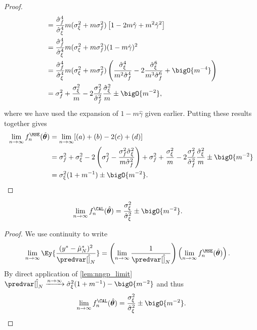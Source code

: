 \begin{proof}
\begin{align*}
        &= \frac{\hat{\sigma}_f^4}{\hat{\sigma}_\xi^4}m(\sigma_\xi^2+m\sigma_f^2)\left[1-2m\hat{\gamma}+m^2\hat{\gamma}^2\right] \\
        &= \frac{\hat{\sigma}_f^4}{\hat{\sigma}_\xi^4}m(\sigma_\xi^2+m\sigma_f^2)(1-m\hat{\gamma})^2 \\
        &= \frac{\hat{\sigma}_f^4}{\hat{\sigma}_\xi^4}m(\sigma_\xi^2+m\sigma_f^2)\left(\frac{\hat{\sigma}_\xi^4}{m^2\hat{\sigma}_f^4} - 2\frac{\hat{\sigma}_\xi^6}{m^3\hat{\sigma}_f^6} + \bigO{m^{-4}}\right) \\
        &= \sigma_f^2 + \frac{\sigma_\xi^2}{m} - 2\frac{\sigma_f^2}{\hat{\sigma}_f^2}\frac{\hat{\sigma}_\xi^2}{m} \pm \bigO{m^{-2}},
    \end{align*}
    where we have used the expansion of \(1-m\hat{\gamma}\) given earlier. Putting these results together gives
    \begin{align*}
        \lim_{n\rightarrow\infty}f_n^{\MSE}(\hat{\bm{\theta}}) &= \lim_{n\rightarrow\infty} [(a) + (b) -2 (c) + (d)] \\
        &= \sigma_f^2 + \sigma_\xi^2 - 2\left(\sigma_f^2 - \frac{\sigma_f^2\hat{\sigma}_\xi^2}{m\hat{\sigma}_f^2}\right) + \sigma_f^2 + \frac{\sigma_\xi^2}{m} - 2\frac{\sigma_f^2}{\hat{\sigma}_f^2}\frac{\hat{\sigma}_\xi^2}{m} \pm \bigO{m^{-2}} \\
        &= \sigma_\xi^2(1+m^{-1}) \pm \bigO{m^{-2}}.
    \end{align*}
\end{proof}

\begin{lemma}
    \label{lem:mismatched_cal_limit}
    \begin{align*}
    \lim_{n\rightarrow\infty} f_n^{\CAL}(\hat{\bm{\theta}}) &= \frac{\sigma_\xi^2}{\hat{\sigma}_\xi^2} \pm \bigO{m^{-2}}.
    \end{align*}
\end{lemma}
\begin{proof}\label{proof:mismatched_cal_limit}
        We use continuity to write
    \begin{align*}
        \lim_{n\rightarrow\infty}\Ey{\frac{(y^*-\hat{\mu}_N^*)^2}{\predvar[\hat]_N}}  &= \left(\lim_{n\rightarrow\infty}\frac{1}{\predvar[\hat]_N}\right)\left(\lim_{n\rightarrow\infty}f_n^{\MSE}(\hat{\bm{\theta}})\right).
    \end{align*}
    By direct application of \autoref{lem:nngp_limit} \(\predvar[\hat]_N\xrightarrow{n\rightarrow\infty} \hat{\sigma}_\xi^2(1+m^{-1}) - \bigO{m^{-2}}\) and thus
    \[\lim_{n\rightarrow\infty} f_n^{\CAL}(\hat{\bm{\theta}}) = \frac{\sigma_\xi^2}{\hat{\sigma}_\xi^2} \pm \bigO{m^{-2}}.\]
\end{proof}

